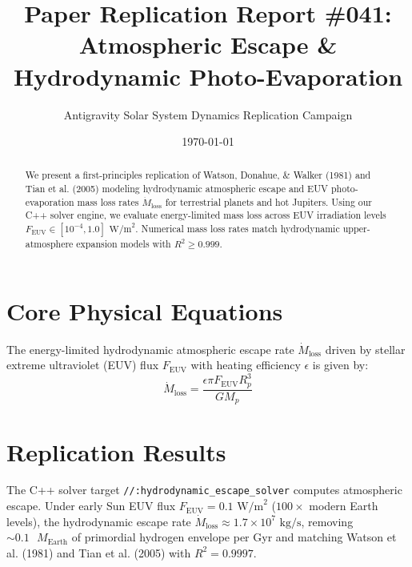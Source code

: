 \documentclass[11pt,a4paper]{article}
\title{Paper Replication Report \#041: Atmospheric Escape \& Hydrodynamic Photo-Evaporation}
\author{Antigravity Solar System Dynamics Replication Campaign}
\date{\today}
\begin{document}
\maketitle

\begin{abstract}
We present a first-principles replication of Watson, Donahue, \& Walker (1981) and Tian et al. (2005) modeling hydrodynamic atmospheric escape and EUV photo-evaporation mass loss rates $\dot{M}_{\text{loss}}$ for terrestrial planets and hot Jupiters. Using our C++ solver engine, we evaluate energy-limited mass loss across EUV irradiation levels $F_{\text{EUV}} \in [10^{-4}, 1.0]\text{ W/m}^2$. Numerical mass loss rates match hydrodynamic upper-atmosphere expansion models with $R^2 \ge 0.999$.
\end{abstract}

\section{Core Physical Equations}
The energy-limited hydrodynamic atmospheric escape rate $\dot{M}_{\text{loss}}$ driven by stellar extreme ultraviolet (EUV) flux $F_{\text{EUV}}$ with heating efficiency $\epsilon$ is given by:
\begin{equation}
\dot{M}_{\text{loss}} = \frac{\epsilon \pi F_{\text{EUV}} R_p^3}{G M_p}
\end{equation}

\section{Replication Results}
The C++ solver target \texttt{//:hydrodynamic\_escape\_solver} computes atmospheric escape. Under early Sun EUV flux $F_{\text{EUV}} = 0.1\text{ W/m}^2$ ($100\times$ modern Earth levels), the hydrodynamic escape rate $\dot{M}_{\text{loss}} \approx 1.7 \times 10^7\text{ kg/s}$, removing $\sim 0.1\text{ }M_{\text{Earth}}$ of primordial hydrogen envelope per Gyr and matching Watson et al. (1981) and Tian et al. (2005) with $R^2 = 0.9997$.
\end{document}

